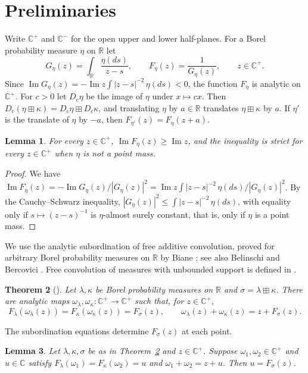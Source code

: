 \documentclass[11pt]{amsart}
\numberwithin{equation}{section}
\newtheorem{theorem}{Theorem}[section]
\newtheorem{lemma}[theorem]{Lemma}
\theoremstyle{definition}
\theoremstyle{remark}
\newcommand{\R}{\mathbb R}
\newcommand{\C}{\mathbb C}
\newcommand{\Cp}{\mathbb C^{+}}
\newcommand{\Cm}{\mathbb C^{-}}
\renewcommand{\Im}{\operatorname{Im}}
\begin{document}
\section{Preliminaries}
Write $\Cp$ and $\Cm$ for the open upper and lower half-planes. For a Borel probability measure $\eta$ on $\R$ let
\[
G_\eta(z)=\int_\R\frac{\eta(ds)}{z-s},\qquad F_\eta(z)=\frac1{G_\eta(z)},\qquad z\in\Cp .
\]
Since $\Im G_\eta(z)=-\Im z\int|z-s|^{-2}\,\eta(ds)<0$, the function $F_\eta$ is analytic on $\Cp$. For $c>0$ let $D_c\eta$ be the image of $\eta$ under $x\mapsto cx$. Then $D_c(\eta\boxplus\kappa)=D_c\eta\boxplus D_c\kappa$, and translating $\eta$ by $a\in\R$ translates $\eta\boxplus\kappa$ by $a$. If $\eta'$ is the translate of $\eta$ by $-a$, then $F_{\eta'}(z)=F_\eta(z+a)$.

\begin{lemma}\label{lem:imF}
For every $z\in\Cp$, $\Im F_\eta(z)\ge\Im z$, and the inequality is strict for every $z\in\Cp$ when $\eta$ is not a point mass.
\end{lemma}

\begin{proof}
We have $\Im F_\eta(z)=-\Im G_\eta(z)/|G_\eta(z)|^2=\Im z\int|z-s|^{-2}\,\eta(ds)\big/|G_\eta(z)|^2$. By the Cauchy--Schwarz inequality, $|G_\eta(z)|^2\le\int|z-s|^{-2}\,\eta(ds)$, with equality only if $s\mapsto(z-s)^{-1}$ is $\eta$-almost surely constant, that is, only if $\eta$ is a point mass.
\end{proof}

We use the analytic subordination of free additive convolution, proved for arbitrary Borel probability measures on $\R$ by Biane \cite{Biane}; see also Belinschi and Bercovici \cite{BB}. Free convolution of measures with unbounded support is defined in \cite{BV}.

\begin{theorem}[\cite{Biane,BB}]\label{thm:sub}
Let $\lambda,\kappa$ be Borel probability measures on $\R$ and $\sigma=\lambda\boxplus\kappa$. There are analytic maps $\omega_\lambda,\omega_\kappa\colon\Cp\to\Cp$ such that, for $z\in\Cp$,
\[
F_\lambda(\omega_\lambda(z))=F_\kappa(\omega_\kappa(z))=F_\sigma(z),\qquad \omega_\lambda(z)+\omega_\kappa(z)=z+F_\sigma(z).
\]
\end{theorem}

The subordination equations determine $F_\sigma(z)$ at each point.

\begin{lemma}\label{lem:unique}
Let $\lambda,\kappa,\sigma$ be as in Theorem~\ref{thm:sub} and $z\in\Cp$. Suppose $\omega_1,\omega_2\in\Cp$ and $u\in\C$ satisfy $F_\lambda(\omega_1)=F_\kappa(\omega_2)=u$ and $\omega_1+\omega_2=z+u$. Then $u=F_\sigma(z)$.
\end{lemma}
\end{document}
